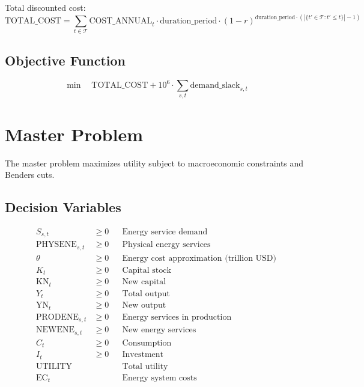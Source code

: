\documentclass[11pt]{article}
\begin{document}
Total discounted cost:
\begin{equation}
\text{TOTAL\_COST} = \sum_{t \in \mathcal{T}} \text{COST\_ANNUAL}_t \cdot \text{duration\_period} \cdot (1-r)^{\text{duration\_period} \cdot (|\{t' \in \mathcal{T} : t' \leq t\}| - 1)}
\end{equation}

\subsection{Objective Function}
\begin{equation}
\min \quad \text{TOTAL\_COST} + 10^6 \cdot \sum_{s,t} \text{demand\_slack}_{s,t}
\end{equation}

\section{Master Problem}

The master problem maximizes utility subject to macroeconomic constraints and Benders cuts.

\subsection{Decision Variables}
\begin{align}
S_{s,t} &\geq 0 && \text{Energy service demand} \\
\text{PHYSENE}_{s,t} &\geq 0 && \text{Physical energy services} \\
\theta &\geq 0 && \text{Energy cost approximation (trillion USD)} \\
K_t &\geq 0 && \text{Capital stock} \\
\text{KN}_t &\geq 0 && \text{New capital} \\
Y_t &\geq 0 && \text{Total output} \\
\text{YN}_t &\geq 0 && \text{New output} \\
\text{PRODENE}_{s,t} &\geq 0 && \text{Energy services in production} \\
\text{NEWENE}_{s,t} &\geq 0 && \text{New energy services} \\
C_t &\geq 0 && \text{Consumption} \\
I_t &\geq 0 && \text{Investment} \\
\text{UTILITY} &\quad && \text{Total utility} \\
\text{EC}_t &\quad && \text{Energy system costs}
\end{align}
\end{document}

